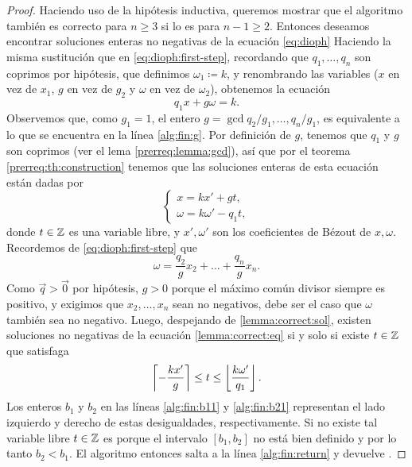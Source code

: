 \begin{proof}
	Haciendo uso de la hipótesis inductiva, queremos mostrar que el algoritmo también es correcto
	para $n \geq 3$ si lo es para $n - 1 \geq 2$. Entonces deseamos encontrar soluciones enteras no
	negativas de la ecuación \eqref{eq:dioph} Haciendo la misma sustitución que en
	\eqref{eq:dioph:first-step}, recordando que $q_1, \ldots, q_n$ son coprimos por hipótesis, que
	definimos $\omega_1 \coloneq k$, y renombrando las variables ($x$ en vez de $x_1$, $g$ en vez de
	$g_2$ y $\omega$ en vez de $\omega_2$), obtenemos la ecuación
	\begin{equation}
		\label{lemma:correct:eq}
		q_1x + g\omega = k.
	\end{equation}
	Observemos que, como $g_1 = 1$, el entero $g = \gcd{q_2/g_1, \ldots, q_n/g_1}$, es equivalente a
	lo que se encuentra en la línea \ref{alg:fin:g}. Por definición de $g$, tenemos que $q_1$ y $g$
	son coprimos (ver el lema \ref{prerreq:lemma:gcd}), así que por el teorema
	\ref{prerreq:th:construction} tenemos que las soluciones enteras de esta ecuación están dadas por
	\begin{equation}
		\label{lemma:correct:sol}
		\begin{cases}
			x = kx' + gt, \\
			\omega = k\omega' - q_1t,
		\end{cases}
	\end{equation}
	donde $t \in \mathbb{Z}$ es una variable libre, y $x', \omega'$ son los coeficientes de Bézout de $x,
	\omega$. Recordemos de \eqref{eq:dioph:first-step} que
	\begin{equation}
		\label{lemma:correct:eq-omega}
		\omega = \frac{q_2}{g}x_2 + \ldots + \frac{q_n}{g}x_n.
	\end{equation}
	Como $\vec{q} > \vec{0}$ por hipótesis, $g > 0$ porque el máximo común divisor siempre es
	positivo, y exigimos que $x_2, \ldots, x_n$ sean no negativos, debe ser el caso que $\omega$
	también sea no negativo. Luego, despejando de \ref{lemma:correct:sol}, existen soluciones no
	negativas de la ecuación \eqref{lemma:correct:eq} si y solo si existe $t \in \mathbb{Z}$ que satisfaga
	\begin{equation}
		\label{feas}
		\left\lceil -\frac{kx'}{g} \right\rceil \leq t \leq \left\lfloor \frac{k\omega'}{q_1} \right\rfloor.
	\end{equation}
	Los enteros $b_1$ y $b_2$ en las líneas \ref{alg:fin:b11} y \ref{alg:fin:b21} representan el
	lado izquierdo y derecho de estas desigualdades, respectivamente. Si no existe tal variable
	libre $t \in \mathbb{Z}$ es porque el intervalo $[b_1, b_2]$ no está bien definido y por lo tanto $b_2 <
	b_1$. El algoritmo entonces salta a la línea \ref{alg:fin:return} y devuelve \NIL.


\end{proof}
